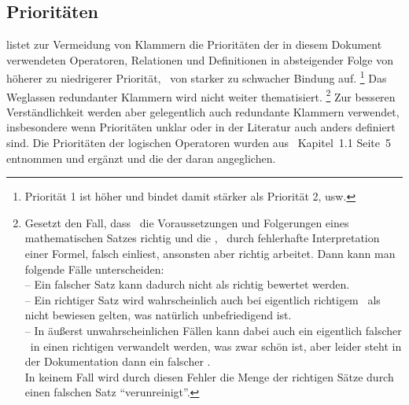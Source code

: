 \subsection{Prioritäten}%
\label{sub:Prioritäten}

 listet zur Vermeidung von Klammern die Prioritäten der in diesem Dokument verwendeten Operatoren, Relationen und Definitionen in absteigender Folge von höherer zu niedrigerer Priorität, \textdh\ von starker zu schwacher Bindung auf.%
\footnote{Priorität 1 ist höher und bindet damit stärker als Priorität 2, usw.}
Das Weglassen redundanter Klammern wird  nicht weiter thematisiert.%
\footnote{%
	Gesetzt den Fall, dass \ASBA\ die Voraussetzungen und Folgerungen eines mathematischen Satzes richtig und die \Beweisschritte, \textzB\ durch fehlerhafte Interpretation einer Formel, falsch einliest, ansonsten aber richtig arbeitet.
	Dann kann man folgende Fälle unterscheiden:\\
	-- Ein falscher Satz kann dadurch nicht als richtig bewertet werden.\\
	-- Ein richtiger Satz wird wahrscheinlich auch bei eigentlich richtigem \Beweis\ als nicht bewiesen gelten, was natürlich unbefriedigend ist.\\
	-- In äußerst unwahrscheinlichen Fällen kann dabei auch ein eigentlich falscher \Beweis\ in einen richtigen verwandelt werden, was zwar schön ist, aber leider steht in der Dokumentation dann ein falscher \Beweis.\\
	In keinem Fall wird durch diesen Fehler die Menge der richtigen Sätze durch einen falschen Satz \enquote{verunreinigt}.
}
Zur besseren Verständlichkeit werden aber gelegentlich auch redundante Klammern verwendet, insbesondere wenn Prioritäten unklar oder in der Literatur auch anders definiert sind.
Die Prioritäten der logischen Operatoren wurden aus~\cite{bib:Rautenberg} Kapitel~1.1 Seite~5 entnommen und ergänzt und die der  daran angeglichen.

